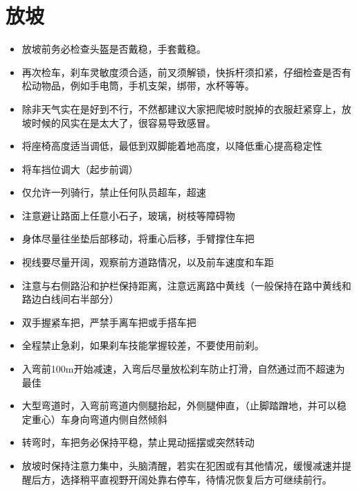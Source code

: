 \documentclass{ctexbook}
\begin{document}
\section{放坡}
\begin{itemize}
    \item 放坡前务必检查头盔是否戴稳，手套戴稳。

    \item 再次检车，刹车灵敏度须合适，前叉须解锁，快拆杆须扣紧，仔细检查是否有松动物品，例如手电筒，手机支架，绑带，水杯等等。

    \item 除非天气实在是好到不行，不然都建议大家把爬坡时脱掉的衣服赶紧穿上，放坡时候的风实在是太大了，很容易导致感冒。
    
    \item 将座椅高度适当调低，最低到双脚能着地高度，以降低重心提高稳定性

    \item 将车挡位调大（起步前调）
    
    \item 仅允许一列骑行，禁止任何队员超车，超速

    \item 注意避让路面上任意小石子，玻璃，树枝等障碍物

    \item 身体尽量往坐垫后部移动，将重心后移，手臂撑住车把

    \item 视线要尽量开阔，观察前方道路情况，以及前车速度和车距

    \item 注意与右侧路沿和护栏保持距离，注意远离路中黄线（一般保持在路中黄线和路边白线间右半部分）

    \item 双手握紧车把，严禁手离车把或手搭车把

    \item 全程禁止急刹，如果刹车技能掌握较差，不要使用前刹。

    \item 入弯前100m开始减速，入弯后尽量放松刹车防止打滑，自然通过而不超速为最佳

    \item 大型弯道时，入弯前弯道内侧腿抬起，外侧腿伸直，（止脚踏蹭地，并可以稳定重心）车身向弯道内侧自然倾斜

    \item 转弯时，车把务必保持平稳，禁止晃动摇摆或突然转动

    \item 放坡时保持注意力集中，头脑清醒，若实在犯困或有其他情况，缓慢减速并提醒后方，选择稍平直视野开阔处靠右停车，待情况恢复后方可继续前行。


\end{itemize}
\end{document}
